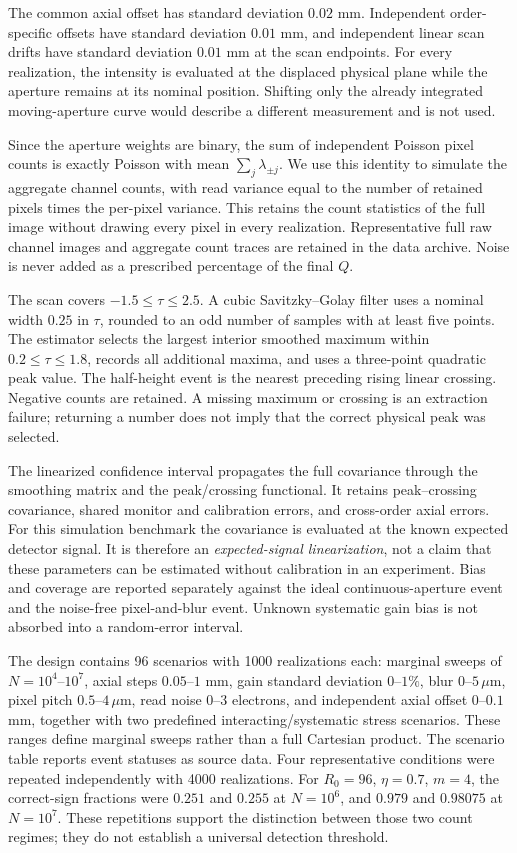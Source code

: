 The common axial offset has standard deviation $0.02$ mm. Independent
order-specific offsets have standard deviation $0.01$ mm, and independent
linear scan drifts have standard deviation $0.01$ mm at the scan endpoints.
For every realization, the intensity is evaluated at the displaced physical
plane while the aperture remains at its nominal position. Shifting only
the already integrated moving-aperture curve would describe a different
measurement and is not used.

Since the aperture weights are binary, the sum of independent Poisson pixel
counts is exactly Poisson with mean $\sum_j\lambda_{\pm j}$. We use this
identity to simulate the aggregate channel counts, with read variance equal
to the number of retained pixels times the per-pixel variance. This retains
the count statistics of the full image without drawing every pixel in every
realization. Representative full raw channel images and aggregate count
traces are retained in the data archive. Noise is never added as a prescribed
percentage of the final $Q$.

The scan covers $-1.5\leq\tau\leq2.5$. A cubic Savitzky--Golay filter uses
a nominal width $0.25$ in $\tau$, rounded to an odd number of samples with
at least five points. The estimator selects the largest interior smoothed
maximum within $0.2\leq\tau\leq1.8$, records all additional maxima, and
uses a three-point quadratic peak value. The half-height event is the
nearest preceding rising linear crossing. Negative counts are retained.
A missing maximum or crossing is an extraction failure; returning a number
does not imply that the correct physical peak was selected.

The linearized confidence interval propagates the full covariance through
the smoothing matrix and the peak/crossing functional. It retains
peak--crossing covariance, shared monitor and calibration errors, and
cross-order axial errors. For this simulation benchmark the covariance is
evaluated at the known expected detector signal. It is therefore an
\emph{expected-signal linearization}, not a claim that these parameters can be
estimated without calibration in an experiment. Bias and coverage are
reported separately against the ideal continuous-aperture event and the
noise-free pixel-and-blur event. Unknown systematic gain bias is not absorbed
into a random-error interval.

The design contains 96 scenarios with 1000 realizations each: marginal
sweeps of $N=10^4$--$10^7$, axial steps $0.05$--$1$ mm, gain standard
deviation $0$--$1\%$, blur $0$--$5\,\mu$m, pixel pitch
$0.5$--$4\,\mu$m, read noise $0$--$3$ electrons, and independent axial
offset $0$--$0.1$ mm, together with two predefined interacting/systematic
stress scenarios. These ranges define marginal sweeps rather than a full
Cartesian product. The scenario table reports event statuses as source data.
Four representative conditions were repeated independently with 4000
realizations. For $R_0=96$, $\eta=0.7$, $m=4$, the correct-sign fractions
were $0.251$ and $0.255$ at $N=10^6$, and $0.979$ and $0.98075$ at
$N=10^7$. These repetitions support the distinction between those two
count regimes; they do not establish a universal detection threshold.

